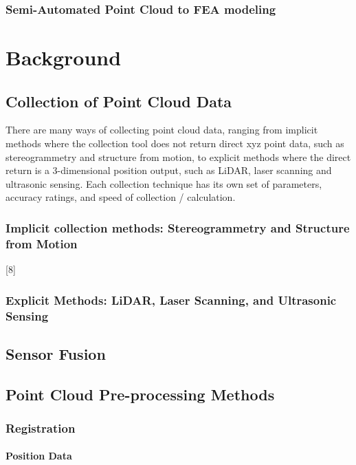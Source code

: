 \documentclass[12pt]{drexelthesis}
\begin{document}
\subsection{Semi-Automated Point Cloud to FEA modeling}
\label{subsec:SemiFEA}
%
%
\chapter{Background}
\label{chap:background}
\section{Collection of Point Cloud Data}
\label{sec:PCcollection}
There are many ways of collecting point cloud data, ranging from implicit methods where the collection tool does not return direct xyz point data, such as stereogrammetry and structure from motion, to explicit methods where the direct return is a 3-dimensional position output, such as LiDAR, laser scanning and ultrasonic sensing. Each collection technique has its own set of parameters, accuracy ratings, and speed of collection / calculation.
\subsection{Implicit collection methods: Stereogrammetry and Structure from Motion}
\label{subsec:implicit}
[8]
\subsection{Explicit Methods: LiDAR, Laser Scanning, and Ultrasonic Sensing}
\label{subsec:explicit}
\section{Sensor Fusion}
\label{sec:fusion}
\section{Point Cloud Pre-processing Methods}
\label{sec:preprocessing}
\subsection{Registration}
\subsubsection{Position Data}
\end{document}
